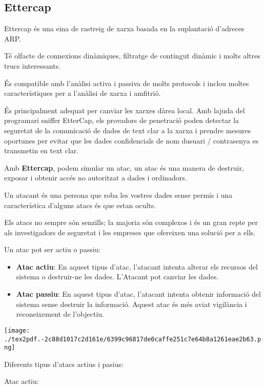 \documentclass[]{article}
\begin{document}
\hypertarget{ettercap}{%
\subsection{\texorpdfstring{\textbf{Ettercap}}{Ettercap}}\label{ettercap}}

Ettercap és una eina de rastreig de xarxa basada en la suplantació
d'adreces ARP.

Té olfacte de connexions dinàmiques, filtratge de contingut dinàmic i
molts altres trucs interessants.

És compatible amb l'anàlisi activa i passiva de molts protocols i inclou
moltes característiques per a l'anàlisi de xarxa i amfitrió.

És principalment adequat per canviar les xarxes dàrea local. Amb lajuda
del programari sniffer EtterCap, els provadors de penetració poden
detectar la seguretat de la comunicació de dades de text clar a la xarxa
i prendre mesures oportunes per evitar que les dades confidencials de
nom dusuari / contrasenya es transmetin en text clar.

Amb \textbf{Ettercap}, podem simular un atac, un atac és una manera de
destruir, exposar i obtenir accés no autoritzat a dades i ordinadors.

Un atacant és una persona que roba les vostres dades sense permís i una
característica d'alguns atacs és que estan ocults.

Els atacs no sempre són senzills; la majoria són complexos i és un gran
repte per als investigadors de seguretat i les empreses que ofereixen
una solució per a ells.

Un atac pot ser actiu o passiu:

\begin{itemize}
\item
  \textbf{Atac actiu}: En aquest tipus d'atac, l'atacant intenta alterar
  els recursos del sistema o destruir-ne les dades. L'Atacant pot
  canviar les dades.
\item
  \textbf{Atac passiu}: En aquest tipus d'atac, l'atacant intenta
  obtenir informació del sistema sense destruir la informació. Aquest
  atac és més aviat vigilància i reconeixement de l'objectiu.
\end{itemize}

\texttt{[image: ./tex2pdf.-2c88d1017c2d161e/6399c96817de0caffe251c7e64b8a1261eae2b63.png]}

Diferents tipus d'atacs actius i pasius:

Atac actiu:
\end{document}
